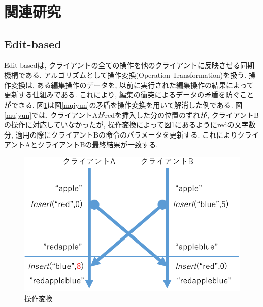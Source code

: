 \section{関連研究}
%
\subsection{Edit-based}
Edit-basedは, クライアントの全ての操作を他のクライアントに反映させる同期機構である.
アルゴリズムとして操作変換(Operation Transformation)\cite{OT}を扱う.
操作変換は, ある編集操作のデータを, 以前に実行された編集操作の結果によって更新する仕組みである.
これにより, 編集の衝突によるデータの矛盾を防ぐことができる.
図\ref{ot}は図\ref{mujyun}の矛盾を操作変換を用いて解消した例である. 図\ref{mujyun}では, クライアントAがredを挿入した分の位置のずれが, クライアントBの操作に対応していなかったが, 操作変換によって図\ref{ot}にあるようにredの文字数分, 適用の際にクライアントBの命令のパラメータを更新する. これによりクライアントAとクライアントBの最終結果が一致する.
\begin{figure}[htbp]
  \begin{center}
    \includegraphics[scale=0.5]{images/ot}
    \caption{操作変換}
    \label{ot}
  \end{center}
\end{figure}
%
